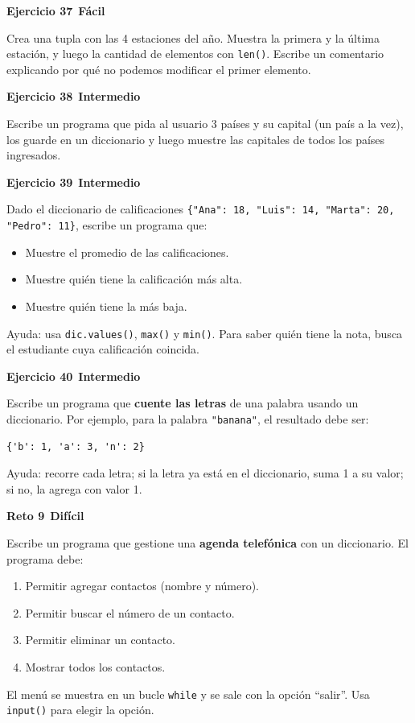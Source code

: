 \documentclass[11pt,a4paper]{article}
\newcommand{\facil}{\textcolor{verdeSignal}{\faIcon{circle}\,\textbf{Fácil}}}
\newcommand{\intermedio}{\textcolor{naranjaVivo}{\faIcon{circle}\,\textbf{Intermedio}}}
\newcommand{\dificil}{\textcolor{rojoAlerta}{\faIcon{circle}\,\textbf{Difícil}}}
\begin{document}
\begin{cajaEjercicio}
\textbf{Ejercicio 37} \facil

Crea una tupla con las 4 estaciones del año. Muestra la primera y la última estación, y luego la cantidad de elementos con \texttt{len()}. Escribe un comentario explicando por qué no podemos modificar el primer elemento.
\end{cajaEjercicio}

\begin{cajaEjercicio}
\textbf{Ejercicio 38} \intermedio

Escribe un programa que pida al usuario 3 países y su capital (un país a la vez), los guarde en un diccionario y luego muestre las capitales de todos los países ingresados.
\end{cajaEjercicio}

\begin{cajaEjercicio}
\textbf{Ejercicio 39} \intermedio

Dado el diccionario de calificaciones \texttt{\{"Ana": 18, "Luis": 14, "Marta": 20, "Pedro": 11\}}, escribe un programa que:
\begin{itemize}
    \item Muestre el promedio de las calificaciones.
    \item Muestre quién tiene la calificación más alta.
    \item Muestre quién tiene la más baja.
\end{itemize}
Ayuda: usa \texttt{dic.values()}, \texttt{max()} y \texttt{min()}. Para saber quién tiene la nota, busca el estudiante cuya calificación coincida.
\end{cajaEjercicio}

\begin{cajaEjercicio}
\textbf{Ejercicio 40} \intermedio

Escribe un programa que \textbf{cuente las letras} de una palabra usando un diccionario. Por ejemplo, para la palabra \texttt{"banana"}, el resultado debe ser:
\begin{lstlisting}[style=pythonStyle]
{'b': 1, 'a': 3, 'n': 2}
\end{lstlisting}
Ayuda: recorre cada letra; si la letra ya está en el diccionario, suma 1 a su valor; si no, la agrega con valor 1.
\end{cajaEjercicio}

\begin{cajaReto}
\textbf{Reto 9} \dificil

Escribe un programa que gestione una \textbf{agenda telefónica} con un diccionario. El programa debe:
\begin{enumerate}
    \item Permitir agregar contactos (nombre y número).
    \item Permitir buscar el número de un contacto.
    \item Permitir eliminar un contacto.
    \item Mostrar todos los contactos.
\end{enumerate}
El menú se muestra en un bucle \texttt{while} y se sale con la opción ``salir''. Usa \texttt{input()} para elegir la opción.
\end{cajaReto}
\end{document}
